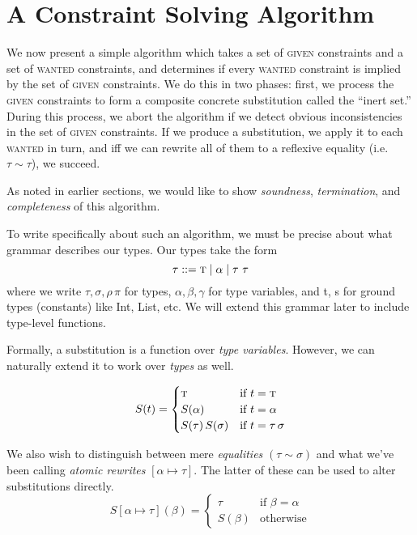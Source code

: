 \documentclass[10pt, letterpaper, oneside]{article}
\begin{document}


\section{A Constraint Solving Algorithm}

We now present a simple algorithm which takes a set of \textsc{given} constraints and a set of \textsc{wanted} constraints, and determines if every \textsc{wanted} constraint is implied by the set of \textsc{given} constraints. We do this in two phases: first, we process the \textsc{given} constraints to form a composite concrete substitution called the ``inert set.'' During this process, we abort the algorithm if we detect obvious inconsistencies in the set of \textsc{given} constraints. If we produce a substitution, we apply it to each \textsc{wanted} in turn, and iff we can rewrite all of them to a reflexive equality (i.e. \(\tau \sim \tau\)), we succeed.

As noted in earlier sections, we would like to show \emph{soundness}, \emph{termination}, and \emph{completeness} of this algorithm.

To write specifically about such an algorithm, we must be precise about what grammar describes our types. Our types take the form
\begin{equation*}
  \tau ::= \text{\sc t} \mid \alpha \mid \tau\ \tau
\end{equation*}
where we write \(\tau, \sigma, \rho\, \pi\) for types, \(\alpha, \beta, \gamma\) for type variables, and {\sc t}, {\sc s} for ground types (constants) like Int, List, etc. We will extend this grammar later to include type-level functions.

Formally, a substitution is a function over \emph{type variables}. However, we can naturally extend it to work over \emph{types} as well.

\begin{equation*}
  S(t) =
  \begin{cases}
    \text{\sc t} & \text{if } t = \text{\sc t}\\
    S(\alpha) & \text{if } t = \alpha\\
    S(\tau)\,S(\sigma) & \text{if } t = \tau\,\sigma
  \end{cases}
\end{equation*}

We also wish to distinguish between mere \emph{equalities} \((\tau \sim \sigma)\) and what we've been calling \emph{atomic rewrites} \([\alpha \mapsto \tau]\). The latter of these can be used to alter substitutions directly.
\begin{equation*}
  S[\alpha \mapsto \tau](\beta) =
  \begin{cases}
    \tau & \text{if } \beta = \alpha\\
    S(\beta) & \text{otherwise}
  \end{cases}
\end{equation*}
\end{document}
